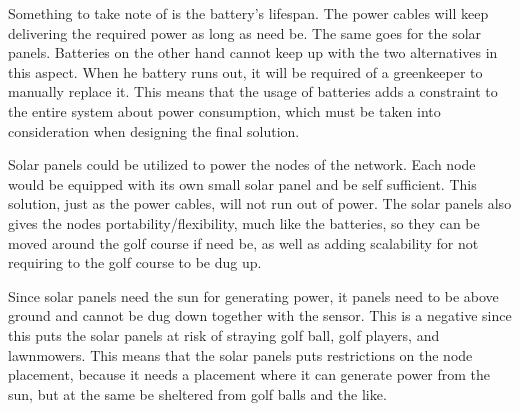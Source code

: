 Something to take note of is the battery's lifespan. The power cables will keep delivering the required power as long as need be. The same goes for the solar panels. Batteries on the other hand cannot keep up with the two alternatives in this aspect. When he battery runs out, it will be required of a greenkeeper to manually replace it. This means that the usage of batteries adds a constraint to the entire system about power consumption, which must be taken into consideration when designing the final solution.

Solar panels could be utilized to power the nodes of the network. Each node would be equipped with its own small solar panel and be self sufficient. This solution, just as the power cables, will not run out of power. The solar panels also gives the nodes portability/flexibility, much like the batteries, so they can be moved around the golf course if need be, as well as adding scalability for not requiring to the golf course to be dug up.

Since solar panels need the sun for generating power, it panels need to be above ground and cannot be dug down together with the sensor. This is a negative since this puts the solar panels at risk of straying golf ball, golf players, and lawnmowers. This means that the solar panels puts restrictions on the node placement, because it needs a placement where it can generate power from the sun, but at the same be sheltered from golf balls and the like.